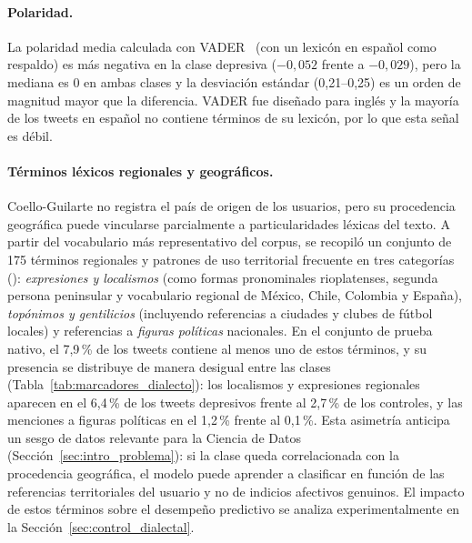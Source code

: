 \documentclass[12pt,a4paper]{article}
\begin{document}
\paragraph{Polaridad.} La polaridad media calculada con VADER~\cite{hutto2014vader} (con un lexicón en español como respaldo) es más negativa en la clase depresiva ($-0{,}052$ frente a $-0{,}029$), pero la mediana es 0 en ambas clases y la desviación estándar (0{,}21--0{,}25) es un orden de magnitud mayor que la diferencia. VADER fue diseñado para inglés y la mayoría de los tweets en español no contiene términos de su lexicón, por lo que esta señal es débil.

\paragraph{Términos léxicos regionales y geográficos.} Coello-Guilarte no registra el país de origen de los usuarios, pero su procedencia geográfica puede vincularse parcialmente a particularidades léxicas del texto. A partir del vocabulario más representativo del corpus, se recopiló un conjunto de 175 términos regionales y patrones de uso territorial frecuente en tres categorías (): \emph{expresiones y localismos} (como formas pronominales rioplatenses, segunda persona peninsular y vocabulario regional de México, Chile, Colombia y España), \emph{topónimos y gentilicios} (incluyendo referencias a ciudades y clubes de fútbol locales) y referencias a \emph{figuras políticas} nacionales. En el conjunto de prueba nativo, el 7{,}9\,\% de los tweets contiene al menos uno de estos términos, y su presencia se distribuye de manera desigual entre las clases (Tabla~\ref{tab:marcadores_dialecto}): los localismos y expresiones regionales aparecen en el 6{,}4\,\% de los tweets depresivos frente al 2{,}7\,\% de los controles, y las menciones a figuras políticas en el 1{,}2\,\% frente al 0{,}1\,\%. Esta asimetría anticipa un sesgo de datos relevante para la Ciencia de Datos (Sección~\ref{sec:intro_problema}): si la clase queda correlacionada con la procedencia geográfica, el modelo puede aprender a clasificar en función de las referencias territoriales del usuario y no de indicios afectivos genuinos. El impacto de estos términos sobre el desempeño predictivo se analiza experimentalmente en la Sección~\ref{sec:control_dialectal}.
\end{document}
